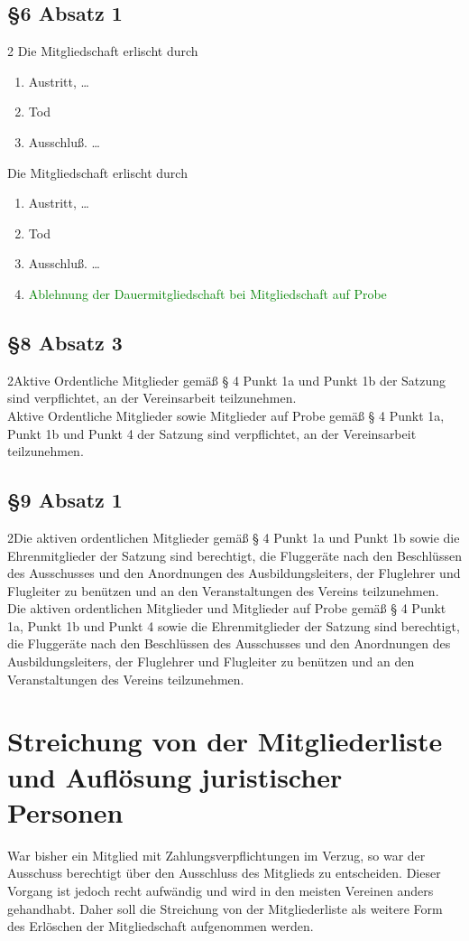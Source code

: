 \documentclass[10pt,a4paper,parskip=half]{scrartcl}
\newcommand{\new}[1]{\textcolor{Green}{#1}}
\newcommand{\compare}[3]{\subsection*{#1}\begin{multicols}{2}#2\columnbreak\\#3\end{multicols}}
\begin{document}
    \subsection*{§6 Absatz 1}
    \begin{multicols}{2}
    Die Mitgliedschaft erlischt durch
    \begin{enumerate}[label=\alph*)]
      \item Austritt, \dots
      \item Tod
      \item{Ausschluß.} \dots
    \end{enumerate}
    \columnbreak
    Die Mitgliedschaft erlischt durch
    \begin{enumerate}[label=\alph*)]
      \item Austritt, \dots
      \item Tod
      \item{Ausschluß.} \dots
      \item \new{Ablehnung der Dauermitgliedschaft bei Mitgliedschaft auf Probe}
    \end{enumerate}
  \end{multicols}


\compare{§8 Absatz 3}
{Aktive Ordentliche Mitglieder gemäß § 4 Punkt 1a und Punkt 1b der Satzung sind verpflichtet, an der Vereinsarbeit teilzunehmen.}
{Aktive Ordentliche Mitglieder sowie Mitglieder auf Probe gemäß § 4 Punkt 1a, Punkt 1b und Punkt 4 der Satzung sind verpflichtet, an der Vereinsarbeit teilzunehmen.}

\compare{§9 Absatz 1}
{Die aktiven ordentlichen Mitglieder gemäß § 4 Punkt 1a und Punkt 1b sowie die Ehrenmitglieder der Satzung sind berechtigt, die Fluggeräte nach den Beschlüssen des Ausschusses und den Anordnungen des Ausbildungsleiters, der Fluglehrer und Flugleiter zu benützen und an den Veranstaltungen des Vereins teilzunehmen.}
{Die aktiven ordentlichen Mitglieder und Mitglieder auf Probe gemäß § 4 Punkt 1a, Punkt 1b und Punkt 4 sowie die Ehrenmitglieder der Satzung sind berechtigt, die Fluggeräte nach den Beschlüssen des Ausschusses und den Anordnungen des Ausbildungsleiters, der Fluglehrer und Flugleiter zu benützen und an den Veranstaltungen des Vereins teilzunehmen.}
    
  \section{Streichung von der Mitgliederliste und Auflösung juristischer Personen}
  War bisher ein Mitglied mit Zahlungsverpflichtungen im Verzug, so war der Ausschuss berechtigt über den Ausschluss des Mitglieds zu entscheiden. Dieser Vorgang ist jedoch recht aufwändig und wird in den meisten Vereinen anders gehandhabt. Daher soll die Streichung von der Mitgliederliste als weitere Form des Erlöschen der Mitgliedschaft aufgenommen werden.
\end{document}
